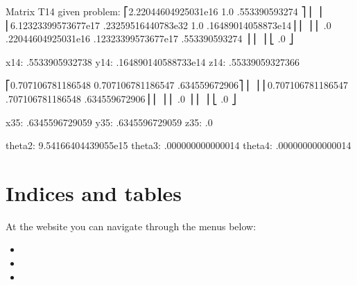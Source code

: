 \documentclass[letterpaper,10pt,english,openany,oneside]{sphinxmanual}
\begin{document}
\begin{sphinxVerbatim}[commandchars=\\\{\},numbers=left,firstnumber=1,stepnumber=1]
  Matrix T14  given problem:
  ⎡2.22044604925031e\PYGZhy{}16          \PYGZhy{}1.0                                 .553390593274  ⎤
  ⎢                                                                                      ⎥
  ⎢6.12323399573677e\PYGZhy{}17  .23259516440783e\PYGZhy{}32          \PYGZhy{}1.0          .16489014058873e\PYGZhy{}14⎥
  ⎢                                                                                      ⎥
  ⎢        .0           .22044604925031e\PYGZhy{}16  .12323399573677e\PYGZhy{}17    .553390593274  ⎥
  ⎢                                                                                      ⎥
  ⎣                                                                       .0         ⎦

  x14: .5533905932738
  y14: .164890140588733e\PYGZhy{}14
  z14: .55339059327366

  ⎡0.707106781186548  \PYGZhy{}0.707106781186547      .634559672906⎤
  ⎢                                                            ⎥
  ⎢0.707106781186547  .707106781186548       .634559672906⎥
  ⎢                                                            ⎥
  ⎢                                     .0                 ⎥
  ⎢                                                            ⎥
  ⎣                                               .0       ⎦

  x35: .6345596729059
  y35: .6345596729059
  z35: .0


  theta\PYGZus{}2: \PYGZhy{}9.54166404439055e\PYGZhy{}15
  theta\PYGZus{}3: .000000000000014
  theta\PYGZus{}4: .000000000000014
\end{sphinxVerbatim}


\chapter{Indices and tables}
\label{\detokenize{index:indices-and-tables}}
At the website you can navigate through the menus below:
\begin{itemize}
\item {} 

\item {} 

\item {} 

\end{itemize}
\end{document}
